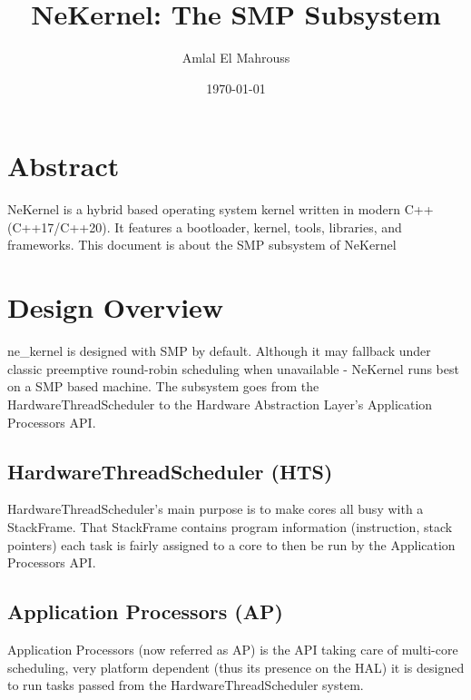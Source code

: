\documentclass{article}
\title{NeKernel: The SMP Subsystem}
\author{Amlal El Mahrouss}
\date{\today}
\begin{document}
\maketitle

\section{Abstract}

{NeKernel is a hybrid based operating system kernel written in modern C++ (C++17/C++20). It features a bootloader, kernel, tools, libraries, and frameworks. This document is about the SMP subsystem of NeKernel}

\section{Design Overview}

ne\_kernel is designed with SMP by default. Although it may fallback under classic preemptive round-robin scheduling when unavailable - NeKernel runs best on a SMP based machine. The subsystem goes from the HardwareThreadScheduler to the Hardware Abstraction Layer's Application Processors API.

\subsection{HardwareThreadScheduler (HTS)}

HardwareThreadScheduler's main purpose is to make cores all busy with a StackFrame. That StackFrame contains program information (instruction, stack pointers) each task is fairly assigned to a core to then be run by the Application Processors API.

\subsection{Application Processors (AP)}

Application Processors (now referred as AP) is the API taking care of multi-core scheduling, very platform dependent (thus its presence on the HAL) it is designed to run tasks passed from the HardwareThreadScheduler system.
\end{document}
